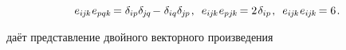 \begin{otherlanguage}{russian}
\nopagebreak\vspace{-0.3em}\begin{equation}\label{veblencontraction}
e_{i\hspace{-0.1ex}j\hspace{-0.1ex}k} \hspace{.1ex} e_{pqk} \hspace{-0.25ex} = \delta_{ip} \delta_{\hspace{-0.1ex}j\hspace{-0.1ex}q} \hspace{-0.25ex} - \hspace{.1ex} \delta_{iq} \delta_{\hspace{-0.1ex}j\hspace{-0.1ex}p}
\hspace{.2ex} ,
\hspace{.5em}
%
e_{i\hspace{-0.1ex}j\hspace{-0.1ex}k} \hspace{.1ex} e_{pj\hspace{-0.1ex}k} \hspace{-0.25ex} = 2 \hspace{.2ex} \delta_{ip}
\hspace{.2ex} ,
\hspace{.5em}
%
e_{i\hspace{-0.1ex}j\hspace{-0.1ex}k} \hspace{.1ex} e_{i\hspace{-0.1ex}j\hspace{-0.1ex}k} \hspace{-0.25ex} = 6
\hspace{.2ex} .
\end{equation}

  даёт представление двойного векторного произведения


\end{otherlanguage}
